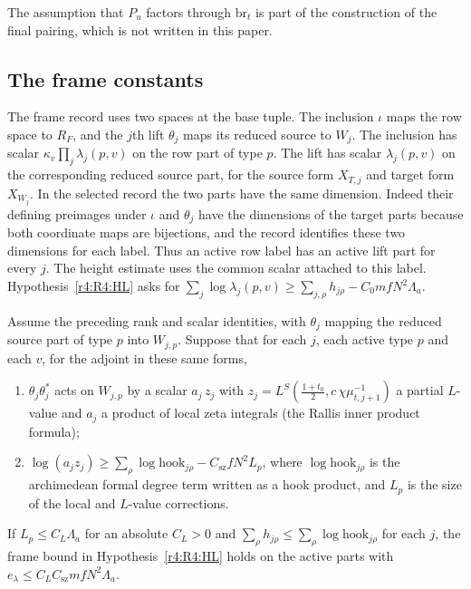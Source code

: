 The assumption that $P_u$ factors through $\mathrm{br}_t$ is part of the construction of the final pairing, which is not written in this paper.

\subsection{The frame constants}\label{w3:sec:HL}

The frame record uses two spaces at the base tuple. The inclusion
$\iota$ maps the row space to $R_F$, and the $j$th lift $\theta_j$
maps its reduced source to $W_j$. The inclusion has scalar
$\kappa_v\prod_j\lambda_j(p,v)$ on the row part of type $p$.
The lift has scalar $\lambda_j(p,v)$ on the corresponding reduced
source part, for the source form $X_{T,j}$ and target form $X_{W_j}$.
In the selected record the two parts have the same dimension.
Indeed their defining preimages under $\iota$ and $\theta_j$
have the dimensions of the target parts because both coordinate
maps are bijections, and the record identifies these two dimensions
for each label. Thus an active row label has an active lift part
for every $j$. The height estimate uses the common scalar attached
to this label. Hypothesis~\ref{r4:R4:HL} asks for
$\sum_j\log\lambda_j(p,v)\ge\sum_{j,\rho}h_{j\rho}-C_0mfN^2\Lambda_a$.

\begin{proposition}\label{w3:W3:HLprop}
Assume the preceding rank and scalar identities, with $\theta_j$
mapping the reduced source part of type $p$ into $W_{j,p}$. Suppose
that for each $j$, each active type $p$ and each $v$, for the adjoint
in these same forms,
\begin{enumerate}
\item[(i)] $\theta_j\theta_j^*$ acts on $W_{j,p}$ by a scalar $a_j\,z_j$ with $z_j=L^S(\frac{1+t_0}2,c\,\chi\mu_{t,j+1}^{-1})$ a partial $L$-value and $a_j$ a product of local zeta integrals (the Rallis inner product formula);
\item[(ii)] $\log(a_jz_j)\ge\sum_\rho\log\mathrm{hook}_{j\rho}-C_{\mathrm{sz}}fN^2L_p$, where $\log\mathrm{hook}_{j\rho}$ is the archimedean formal degree term written as a hook product, and $L_p$ is the size of the local and $L$-value corrections.
\end{enumerate}
If $L_p\le C_L\Lambda_a$ for an absolute $C_L>0$ and $\sum_\rho h_{j\rho}\le\sum_\rho\log\mathrm{hook}_{j\rho}$ for each $j$, the frame bound
in Hypothesis~\ref{r4:R4:HL} holds on the active parts with
$e_\lambda\le C_L C_{\mathrm{sz}}mfN^2\Lambda_a$.
\end{proposition}

